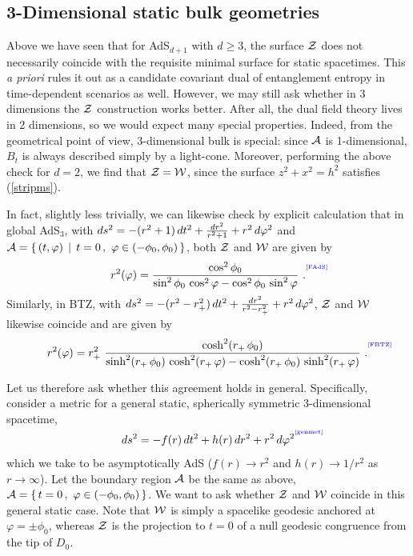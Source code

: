\documentclass[12pt]{article}
\def\req#1{(\ref{#1})}
\def\ph{\varphi}
\def\CA{{\cal A}}
\def\CW{{\cal W}}
\def\CZ{{\cal Z}}
\def\Label#1{\label{#1}%
{ \color{blue}{\smash{\hbox to0pt{\raise2ex\hbox{\tiny[#1]}\hss}}}}}
\def\Gms{\CW}
\def\Cms{\CZ}
\def\rA{\CA}
\def\set#1{\{ \, #1 \, \}}
\def\st{ \, \mid \, }
\def\pho{\phi_0}
\def\rh{r_+}
\begin{document}
\subsection{3-Dimensional static bulk geometries}

Above we have seen that for AdS$_{d+1}$ with $d\ge3$, the surface $\Cms$ does not necessarily coincide with the requisite minimal surface for static spacetimes.  This {\it a priori} rules it out as a candidate covariant dual of entanglement entropy in time-dependent scenarios as well.
However, we may still ask whether in 3 dimensions the $\Cms$ construction works better.
After all, the dual field theory lives in 2 dimensions, so we would expect many special properties.  Indeed, from the geometrical point of view, 3-dimensional bulk is special: since $\rA$ is 1-dimensional, $B_t$ is always described simply by  a light-cone.
Moreover, performing the above check for $d=2$, we find that $\Cms = \Gms$, since the surface $z^2+x^2=h^2$ satisfies \req{stripms}.

In fact, slightly less trivially, we can likewise check by explicit calculation that in global AdS$_3$, with $ds^2 = - (r^2 + 1) \, dt^2 + {dr^2 \over r^2 + 1} + r^2 \, d\ph^2$ and
$\rA = \set{ (t,\ph) \st t=0 \, , \ \ph \in (-\pho,\pho) }$, both $\Cms$ and $\Gms$ are given by
%
\begin{equation}
r^2 (\ph) = { \cos^2 \pho  \over \sin^2 \pho \, \cos^2 \ph - \cos^2 \pho \, \sin^2 \ph } \ .
\Label{FAdS}
\end{equation}
%
Similarly, in BTZ, with
$ds^2 = - (r^2 - \rh^2) \, dt^2 + {dr^2 \over r^2 - \rh^2} + r^2 \, d\ph^2$,
$\Cms$ and $\Gms$ likewise coincide and are given by
%
\begin{equation}
r^2 (\ph) = \rh^2 \
{ \cosh^2 ( \rh \, \pho)  \over \sinh^2
  ( \rh \, \pho) \, \cosh^2  ( \rh \, \ph) - \cosh^2
   ( \rh \, \pho) \, \sinh^2  ( \rh \, \ph) } \ .
\Label{FBTZ}
\end{equation}
%



Let us therefore ask whether this agreement holds in general.  Specifically, consider a metric for a general static, spherically symmetric 3-dimensional spacetime,
%
\begin{equation}
ds^2 = -f(r) \, dt^2 + h(r) \, dr^2 + r^2 \, d\ph^2
\Label{genmet}
\end{equation}
%
which we take to be asymptotically AdS
($f(r) \to r^2$ and $h(r) \to 1/r^2$ as $r \to \infty$).
Let the boundary region $\rA$ be the same as above,
$\rA = \set{t=0 \, , \ \ph \in (-\pho,\pho) }$.
We want to ask whether $\Cms$ and $\Gms$ coincide in this general static case.
Note that $\Gms$ is simply a spacelike geodesic anchored at $\ph=\pm\pho$, whereas $\Cms$ is the projection to $t=0$ of a null geodesic congruence from the tip of $D_0$.
\end{document}

